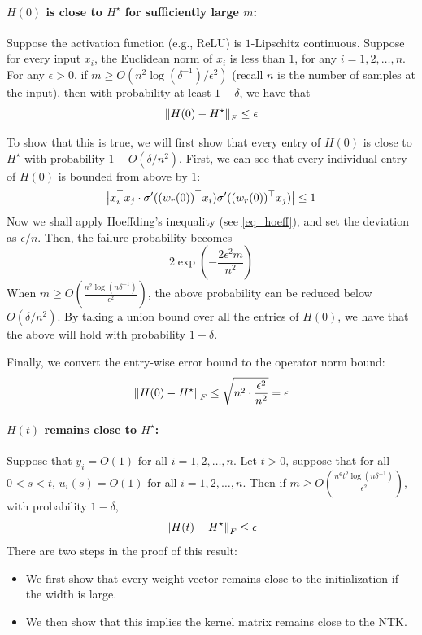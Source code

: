 \paragraph{$H(0)$ is close to $H^{\star}$ for sufficiently large $m$:}
Suppose the activation function (e.g., ReLU) is $1$-Lipschitz continuous.
Suppose for every input $x_i$, the Euclidean norm of $x_i$ is less than $1$, for any $i = 1, 2, \dots, n$.
For any $\epsilon > 0$, if $m \ge O(n^2 \log(\delta^{-1}) / \epsilon^2)$ (recall $n$ is the number of samples at the input), then with probability at least $1 - \delta$, we have that
\[ \left\| H(0) - H^{\star} \right\|_{F} \le \epsilon \]

To show that this is true, we will first show that every entry of $H(0)$ is close to $H^{\star}$ with probability $1 - O(\delta / n^2)$.
First, we can see that every individual entry of $H(0)$ is bounded from above by $1$:
\[ {\left| {x_i^{\top} x_j \cdot \sigma'( (w_r(0))^{\top} x_i ) \sigma'( (w_r(0) )^{\top} x_j )} \right|} \le 1 \]
Now we shall apply Hoeffding's inequality (see \eqref{eq_hoeff}), and set the deviation as $\epsilon / n$.
Then, the failure probability becomes
\[ 2\exp\left( - \frac{2\epsilon^2 m} {n^2} \right) \]
When $m \ge O(\frac {n^2 \log(n\delta^{-1})} {\epsilon^2})$, the above probability can be reduced below $O(\delta / n^2)$.
By taking a union bound over all the entries of $H(0)$, we have that the above will hold with probability $1 - \delta$.

Finally, we convert the entry-wise error bound to the operator norm bound:
\begin{align*}
    \left\| H(0) - H^{\star} \right\|_{F}
    \le \sqrt{n^2 \cdot \frac {\epsilon^2} {n^2}} = \epsilon
\end{align*}

\paragraph{$H(t)$ remains close to $H^{\star}$:}
Suppose that $y_i = O(1)$ for all $i = 1, 2, \dots, n$.
Let $t > 0$, suppose that for all $0 < s < t$, $u_i(s) = O(1)$ for all $i = 1, 2, \dots, n$.
Then if $m \ge O(\frac {n^6 t^2 \log(n \delta^{-1})} {\epsilon^2})$, with probability $1 - \delta$,
\[ \left\| H(t) - H^{\star} \right\|_{F} \le \epsilon \]
There are two steps in the proof of this result:
\begin{itemize}
    \item We first show that every weight vector remains close to the initialization if the width is large.

    \item We then show that this implies the kernel matrix remains close to the NTK.
\end{itemize}

